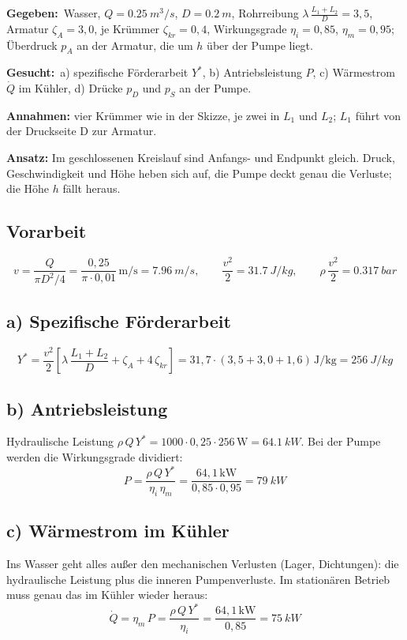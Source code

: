 \documentclass[11pt,a4paper]{article}
\newcommand{\gegeben}{\textbf{Gegeben:}\ }
\newcommand{\gesucht}{\textbf{Gesucht:}\ }
\begin{document}
\gegeben Wasser, $Q = \SI{0.25}{m^3/s}$, $D = \SI{0.2}{m}$, Rohrreibung $\lambda\,\frac{L_1 + L_2}{D} = 3{,}5$, Armatur $\zeta_A = 3{,}0$, je Krümmer $\zeta_{kr} = 0{,}4$, Wirkungsgrade $\eta_i = 0{,}85$, $\eta_m = 0{,}95$; Überdruck $p_A$ an der Armatur, die um $h$ über der Pumpe liegt.

\gesucht a) spezifische Förderarbeit $Y^*$, b) Antriebsleistung $P$, c) Wärmestrom $\dot Q$ im Kühler, d) Drücke $p_D$ und $p_S$ an der Pumpe.

\textbf{Annahmen:} vier Krümmer wie in der Skizze, je zwei in $L_1$ und $L_2$; $L_1$ führt von der Druckseite D zur Armatur.

\textbf{Ansatz:} Im geschlossenen Kreislauf sind Anfangs- und Endpunkt gleich. Druck, Geschwindigkeit und Höhe heben sich auf, die Pumpe deckt genau die Verluste; die Höhe $h$ fällt heraus.

\subsection*{Vorarbeit}
\[
v = \frac{Q}{\pi D^2/4} = \frac{0{,}25}{\pi\cdot 0{,}01}\,\mathrm{m/s} = \SI{7.96}{m/s},
\qquad
\frac{v^2}{2} = \SI{31.7}{J/kg},
\qquad
\rho\,\frac{v^2}{2} = \SI{0.317}{bar}
\]

\subsection*{a) Spezifische Förderarbeit}
\[
Y^* = \frac{v^2}{2}\left[\lambda\,\frac{L_1 + L_2}{D} + \zeta_A + 4\,\zeta_{kr}\right] = 31{,}7\cdot(3{,}5 + 3{,}0 + 1{,}6)\,\mathrm{J/kg} = \SI{256}{J/kg}
\]

\subsection*{b) Antriebsleistung}

Hydraulische Leistung $\rho\,Q\,Y^* = 1000\cdot 0{,}25\cdot 256\,\mathrm{W} = \SI{64.1}{kW}$. Bei der Pumpe werden die Wirkungsgrade dividiert:
\[
P = \frac{\rho\,Q\,Y^*}{\eta_i\,\eta_m} = \frac{64{,}1\,\mathrm{kW}}{0{,}85\cdot 0{,}95} = \SI{79}{kW}
\]

\subsection*{c) Wärmestrom im Kühler}

Ins Wasser geht alles außer den mechanischen Verlusten (Lager, Dichtungen): die hydraulische Leistung plus die inneren Pumpenverluste. Im stationären Betrieb muss genau das im Kühler wieder heraus:
\[
\dot Q = \eta_m\,P = \frac{\rho\,Q\,Y^*}{\eta_i} = \frac{64{,}1\,\mathrm{kW}}{0{,}85} = \SI{75}{kW}
\]
\end{document}
